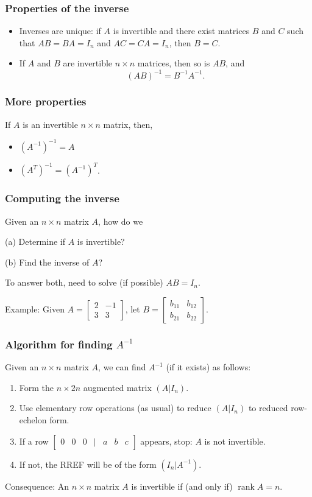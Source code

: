 \documentclass[11pt,t]{beamer}
\DeclareMathOperator{\rank}{rank}
\begin{document}
\begin{frame}\frametitle{Properties of the inverse}
\begin{itemize}
\item Inverses are unique: if $A$ is invertible and there exist matrices $B$ and $C$ such that $AB=BA=I_n$ and $AC=CA=I_n$, then $B=C$.



\vspace{0.5in}

\item If $A$ and $B$ are invertible $n\times n$ matrices, then so is $AB$, and
\[
(AB)^{-1} = B^{-1}A^{-1}.
\]
\end{itemize}
\end{frame}
\begin{frame}\frametitle{More properties}
If $A$ is an invertible $n\times n$ matrix, then,
\begin{itemize}
\item $(A^{-1})^{-1} = A$

\vspace{0.75in}

\item $(A^T)^{-1} = (A^{-1})^T$.
\end{itemize}
\end{frame}
\begin{frame}\frametitle{Computing the inverse}
Given an $n\times n$ matrix $A$, how do we

(a) Determine if $A$ is invertible?

(b) Find the inverse of $A$?

\bigskip

To answer both, need to solve (if possible) $AB=I_n$.

Example: Given $A = \begin{bmatrix}2&-1\\3&3\end{bmatrix}$, let $B = \begin{bmatrix}b_{11}&b_{12}\\b_{21}&b_{22}\end{bmatrix}$.
\end{frame}
\begin{frame}\frametitle{Algorithm for finding $A^{-1}$}
Given an $n\times n$ matrix $A$, we can find $A^{-1}$ (if it exists) as follows:
\begin{enumerate}
\item Form the $n\times 2n$ augmented matrix $(A|I_n)$.
\item Use elementary row operations (as usual) to reduce $(A|I_n)$ to reduced row-echelon form. 
\item If a row $\begin{bmatrix}0&0&0&|&a&b&c\end{bmatrix}$ appears, \alert{stop}: $A$ is not invertible.
\item If not, the RREF will be of the form $(I_n|A^{-1})$.
\end{enumerate}

\bigskip

\alert{Consequence}: An $n\times n$ matrix $A$ is invertible if (and only if) $\rank A = n$.
\end{frame}
\end{document}
